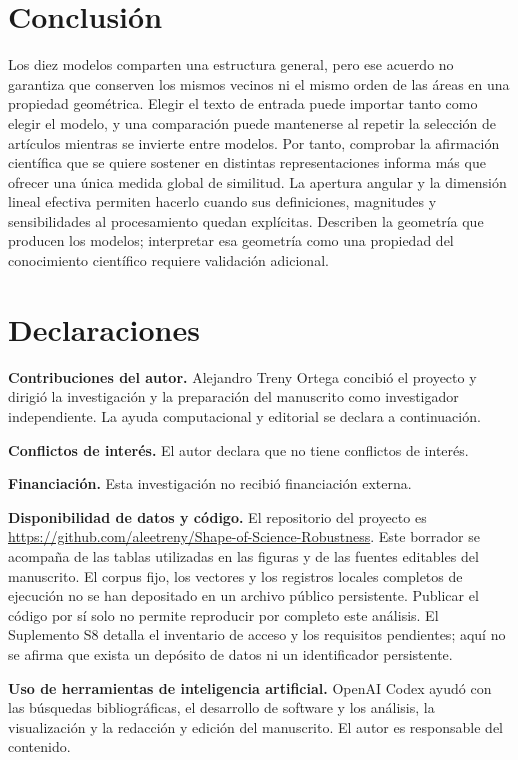 \documentclass[12pt]{article}
\begin{document}
\section{Conclusión}
Los diez modelos comparten una estructura general, pero ese acuerdo no garantiza que conserven los mismos vecinos ni el mismo orden de las áreas en una propiedad geométrica. Elegir el texto de entrada puede importar tanto como elegir el modelo, y una comparación puede mantenerse al repetir la selección de artículos mientras se invierte entre modelos. Por tanto, comprobar la afirmación científica que se quiere sostener en distintas representaciones informa más que ofrecer una única medida global de similitud. La apertura angular y la dimensión lineal efectiva permiten hacerlo cuando sus definiciones, magnitudes y sensibilidades al procesamiento quedan explícitas. Describen la geometría que producen los modelos; interpretar esa geometría como una propiedad del conocimiento científico requiere validación adicional.

\section*{Declaraciones}
\textbf{Contribuciones del autor.}
Alejandro Treny Ortega concibió el proyecto y dirigió la investigación y la preparación del manuscrito como investigador independiente. La ayuda computacional y editorial se declara a continuación.
\par\medskip
\textbf{Conflictos de interés.}
El autor declara que no tiene conflictos de interés.
\par\medskip
\textbf{Financiación.}
Esta investigación no recibió financiación externa.
\par\medskip
\textbf{Disponibilidad de datos y código.}
El repositorio del proyecto es \url{https://github.com/aleetreny/Shape-of-Science-Robustness}. Este borrador se acompaña de las tablas utilizadas en las figuras y de las fuentes editables del manuscrito. El corpus fijo, los vectores y los registros locales completos de ejecución no se han depositado en un archivo público persistente. Publicar el código por sí solo no permite reproducir por completo este análisis. El Suplemento S8 detalla el inventario de acceso y los requisitos pendientes; aquí no se afirma que exista un depósito de datos ni un identificador persistente.
\par\medskip
\textbf{Uso de herramientas de inteligencia artificial.}
OpenAI Codex ayudó con las búsquedas bibliográficas, el desarrollo de software y los análisis, la visualización y la redacción y edición del manuscrito. El autor es responsable del contenido.



\end{document}

